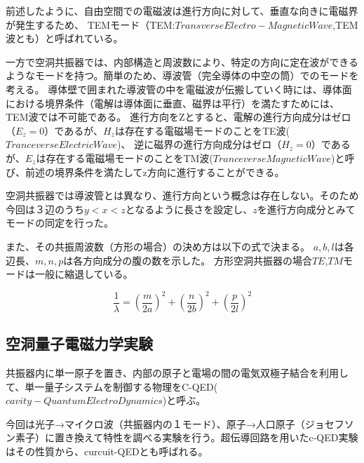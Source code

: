 前述したように、自由空間での電磁波は進行方向に対して、垂直な向きに電磁界が発生するため、
TEMモード（TEM:$Transverse Electro-Magnetic Wave$,TEM波とも）と呼ばれている。

一方で空洞共振器では、内部構造と周波数により、特定の方向に定在波ができるようなモードを持つ。簡単のため、導波管（完全導体の中空の筒）でのモードを考える。
導体壁で囲まれた導波管の中を電磁波が伝搬していく時には、導体面における境界条件（電解は導体面に垂直、磁界は平行）を満たすためには、TEM波では不可能である。
進行方向をZとすると、電解の進行方向成分はゼロ（$E_z = 0$）であるが、$H_z$は存在する電磁場モードのことをTE波($Tranceverse Electric Wave$)、
逆に磁界の進行方向成分はゼロ（$H_z=0$）であるが、$E_z$は存在する電磁場モードのことをTM波($Tranceverse Magnetic Wave$)と呼び、前述の境界条件を満たしてz方向に進行することができる。

空洞共振器では導波管とは異なり、進行方向という概念は存在しない。そのため今回は３辺のうち$y<x<z$となるように長さを設定し、$z$を進行方向成分とみてモードの同定を行った。

また、その共振周波数（方形の場合）の決め方は以下の式で決まる。
$a,b,l$は各辺長、$m,n,p$は各方向成分の腹の数を示した。
方形空洞共振器の場合$TE$,$TM$モードは一般に縮退している。

\[
 \frac{1}{\lambda} = (\frac{m}{2a})^2 + (\frac{n}{2b})^2 + (\frac{p}{2l})^2
\]

\subsection{空洞量子電磁力学実験}
共振器内に単一原子を置き、内部の原子と電場の間の電気双極子結合を利用して、単一量子システムを制御する物理をC-QED($cavity - Quantum ElectroDynamics$)と呼ぶ。

今回は光子→マイクロ波（共振器内の１モード）、原子→人口原子（ジョセフソン素子）に置き換えて特性を調べる実験を行う。超伝導回路を用いたc-QED実験はその性質から、curcuit-QEDとも呼ばれる。
